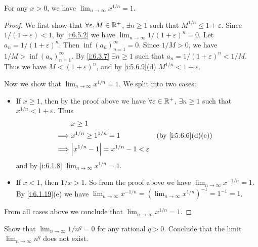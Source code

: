 \begin{lem}\label{i:6.5.3}
  For any \(x > 0\), we have \(\lim_{n \to \infty} x^{1 / n} = 1\).
\end{lem}

\begin{proof}
  We first show that \(\forall \varepsilon, M \in \mathbb{R}^+\), \(\exists n \geq 1\) such that \(M^{1 / n} \leq 1 + \varepsilon\).
  Since \(1 / (1 + \varepsilon) < 1\), by \cref{i:6.5.2} we have \(\lim_{n \to \infty} 1 / (1 + \varepsilon)^n = 0\).
  Let \(a_n = 1 / (1 + \varepsilon)^n\).
  Then \(\inf(a_n)_{n = 1}^\infty = 0\).
  Since \(1 / M > 0\), we have \(1 / M > \inf(a_n)_{n = 1}^\infty\).
  By \cref{i:6.3.7} \(\exists n \geq 1\) such that \(a_n = 1 / (1 + \varepsilon)^n < 1 / M\).
  Thus we have \(M < (1 + \varepsilon)^n\), and by \cref{i:5.6.9}(d) \(M^{1 / n} < 1 + \varepsilon\).

  Now we show that \(\lim_{n \to \infty} x^{1 / n} = 1\).
  We split into two cases:
  \begin{itemize}
    \item If \(x \geq 1\), then by the proof above we have \(\forall \varepsilon \in \mathbb{R}^+\), \(\exists n \geq 1\) such that \(x^{1 / n} < 1 + \varepsilon\).
          Thus
          \begin{align*}
                     & x \geq 1                                                                 \\
            \implies & x^{1 / n} \geq 1^{1 / n} = 1                      &  & \by{i:5.6.6}[d,e] \\
            \implies & \abs{x^{1 / n} - 1} = x^{1 / n} - 1 < \varepsilon
          \end{align*}
          and by \cref{i:6.1.8} \(\lim_{n \to \infty} x^{1 / n} = 1\).
    \item If \(x < 1\), then \(1 / x > 1\).
          So from the proof above we have \(\lim_{n \to \infty} x^{-1 / n} = 1\).
          By \cref{i:6.1.19}(e) we have \(\lim_{n \to \infty} x^{-1 / n} = (\lim_{n \to \infty} x^{1 / n})^{-1} = 1^{-1} = 1\).
  \end{itemize}
  From all cases above we conclude that \(\lim_{n \to \infty} x^{1 / n} = 1\).
\end{proof}

\exercisesection

\begin{ex}\label{i:ex:6.5.1}
  Show that \(\lim_{n \to \infty} 1 / n^q = 0\) for any rational \(q > 0\).
  Conclude that the limit \(\lim_{n \to \infty} n^q\) does not exist.
\end{ex}

